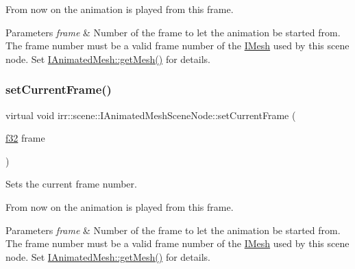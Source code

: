 From now on the animation is played from this frame. 
\begin{DoxyParams}{Parameters}
{\em frame} & Number of the frame to let the animation be started from. The frame number must be a valid frame number of the \hyperlink{classirr_1_1scene_1_1IMesh}{I\+Mesh} used by this scene node. Set \hyperlink{classirr_1_1scene_1_1IAnimatedMesh_adccb39fee83bed36a464cf7b96f3a0ca}{I\+Animated\+Mesh\+::get\+Mesh()} for details. \\
\hline
\end{DoxyParams}
\mbox{\label{classirr_1_1scene_1_1IAnimatedMeshSceneNode_aff1c1e2270f4d3d94e58e7c130c575a4}} 
\subsubsection{\texorpdfstring{set\+Current\+Frame()}{setCurrentFrame()}\hspace{0.1cm}{\footnotesize\ttfamily [2/2]}}
{\footnotesize\ttfamily virtual void irr\+::scene\+::\+I\+Animated\+Mesh\+Scene\+Node\+::set\+Current\+Frame (\begin{DoxyParamCaption}\item[{\hyperlink{namespaceirr_a0277be98d67dc26ff93b1a6a1d086b07}{f32}}]{frame }\end{DoxyParamCaption})\hspace{0.3cm}{\ttfamily [pure virtual]}}



Sets the current frame number. 

From now on the animation is played from this frame. 
\begin{DoxyParams}{Parameters}
{\em frame} & Number of the frame to let the animation be started from. The frame number must be a valid frame number of the \hyperlink{classirr_1_1scene_1_1IMesh}{I\+Mesh} used by this scene node. Set \hyperlink{classirr_1_1scene_1_1IAnimatedMesh_adccb39fee83bed36a464cf7b96f3a0ca}{I\+Animated\+Mesh\+::get\+Mesh()} for details. \\
\hline
\end{DoxyParams}
\mbox{\label{classirr_1_1scene_1_1IAnimatedMeshSceneNode_a900400fe375ca13f48876b84900ffddf}} 
